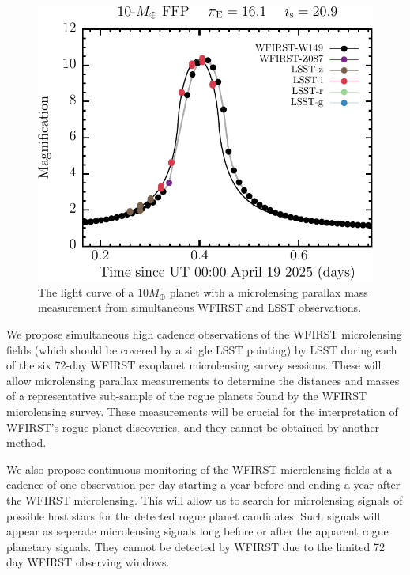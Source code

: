 \begin{figure}[t]
\centering\includegraphics[width=0.5\linewidth]{figs/WFIRST/lsst_lsstm+10_0_7220351_320_det_lc.pdf}
\caption{The light curve of a $10 M_{\oplus}$ planet with a microlensing parallax
mass measurement from simultaneous WFIRST and LSST observations.
\label{fig-lc}}
\end{figure}

We propose simultaneous high cadence observations of the WFIRST microlensing fields
(which should be covered by a single LSST pointing) by LSST during each
of the six 72-day WFIRST exoplanet microlensing survey sessions. These
will allow microlensing parallax measurements to determine the distances
and masses of a representative sub-sample of the rogue planets found by
the WFIRST microlensing survey. These measurements will be crucial for
the interpretation of WFIRST's rogue planet discoveries, and they
cannot be obtained by another method.

We also propose continuous monitoring of the WFIRST microlensing fields
at a cadence of one observation per day
starting a year before and ending a year after the WFIRST microlensing.
This will allow us to search for microlensing signals of possible
host stars for the detected rogue planet candidates. Such signals will
appear as seperate microlensing signals long before or after the apparent
rogue planetary signals. They cannot be detected by WFIRST due to the
limited 72 day WFIRST observing windows.


